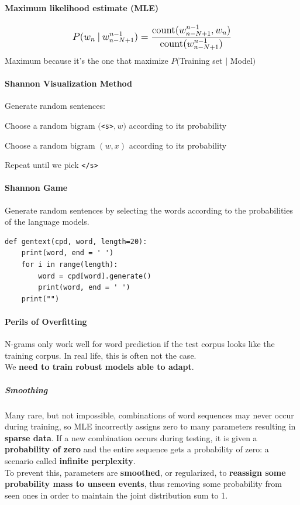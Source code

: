 \documentclass[10pt]{report}
\begin{document}
\paragraph{Maximum likelihood estimate (MLE)}$$\mathlarger{P(w_n\:|\:w_{n-N+1}^{n-1}) = \frac{\hbox{count}(w_{n-N+1}^{n-1},w_n)}{\hbox{count}(w_{n-N+1}^{n-1})}}$$
Maximum because it's the one that maximize $P($Training set $|$ Model$)$
\paragraph{Shannon Visualization Method} Generate random sentences:
\begin{list}{}{}
	\item Choose a random bigram $($\texttt{<s>}$,w)$ according to its probability
	\item Choose a random bigram $(w,x)$ according to its probability
	\item Repeat until we pick \texttt{</s>}
\end{list}
\paragraph{Shannon Game} Generate random sentences by selecting the words according to the probabilities of the language models.
\begin{lstlisting}[style=myPython]
def gentext(cpd, word, length=20):
	print(word, end = ' ')
	for i in range(length):
		word = cpd[word].generate()
		print(word, end = ' ')
	print("")
\end{lstlisting}
\paragraph{Perils of Overfitting} N-grams only work well for word prediction if the test corpus looks like the training corpus. In real life, this is often not the case.\\
We \textbf{need to train robust models able to adapt}.
\subparagraph{Smoothing} Many rare, but not impossible, combinations of word sequences may never occur during training, so MLE incorrectly assigns zero to many parameters resulting in \textbf{sparse data}. If a new combination occurs during testing, it is given a \textbf{probability of zero} and the entire sequence gets a probability of zero: a scenario called \textbf{infinite perplexity}.\\
To prevent this, parameters are \textbf{smoothed}, or regularized, to \textbf{reassign some probability mass to unseen events}, thus removing some probability from seen ones in order to maintain the joint distribution sum to 1.
\end{document}
